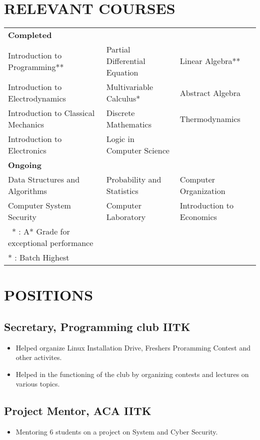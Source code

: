 \documentclass{article}
\begin{document}
\section*{RELEVANT COURSES}
\begin{tabular}{l l l}
\textbf{Completed}\\
 Introduction to Programming** & Partial Differential Equation & Linear Algebra**\\ 
 Introduction to Electrodynamics & Multivariable Calculus* & Abstract Algebra\\
 Introduction to Classical Mechanics & Discrete Mathematics & Thermodynamics\\
 Introduction to Electronics & Logic in Computer Science\\
\textbf{Ongoing}\\
 Data Structures and Algorithms & Probability and Statistics & Computer Organization\\
 Computer System Security & Computer Laboratory & Introduction to Economics\\

 {\footnotesize \ *  : A* Grade for exceptional performance}\\
 {\footnotesize ** : Batch Highest}
 \end{tabular}
 
 \section*{POSITIONS}
    \subsection*{Secretary, Programming club  IITK}
        \begin{itemize}
            \itemsep0em
            \item {Helped organize Linux Installation Drive, Freshers Proramming Contest and other activites.}
            \item {Helped in the functioning of the club by organizing contests and lectures on various topics.}
        \end{itemize}
  
    \subsection*{Project Mentor, ACA IITK}
        \begin{itemize}
            \itemsep0em
            \item Mentoring 6 students on a project on System and Cyber Security.
        \end{itemize}
 
\end{document}
